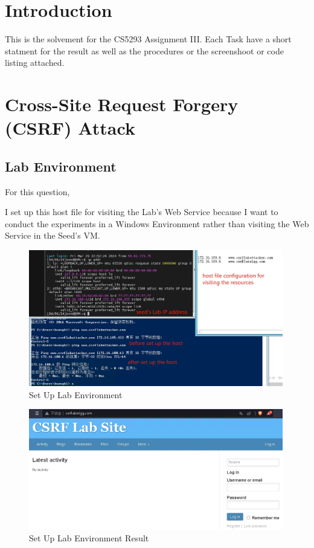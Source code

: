 \documentclass[a4paper,11pt]{article}
\begin{document}

{\hypersetup{hidelinks}
\tableofcontents
}
\newpage
\section{Introduction}
This is the solvement for the CS5293 Assignment III. Each Task have a short statment for the result as well as the procedures or the screenshoot or code listing attached.

\section{Cross-Site Request Forgery (CSRF) Attack}

\subsection{Lab Environment}\label{sec:task1}

For this question, 

I set up this host file for visiting the Lab's Web Service because I want to conduct the experiments in a Windows Environment rather than visiting the Web Service in the Seed's VM.

\begin{figure}[h]
    \centering
       \includegraphics[width=0.99\textwidth]{figures/task1/task1.1.png}
    \caption{Set Up Lab Environment}\label{fig:task1.1}
\end{figure}

\begin{figure}[h]
    \centering
       \includegraphics[width=0.99\textwidth]{figures/task1/task1.2.png}
    \caption{Set Up Lab Environment Result}\label{fig:task1.2}
\end{figure}
\end{document}
